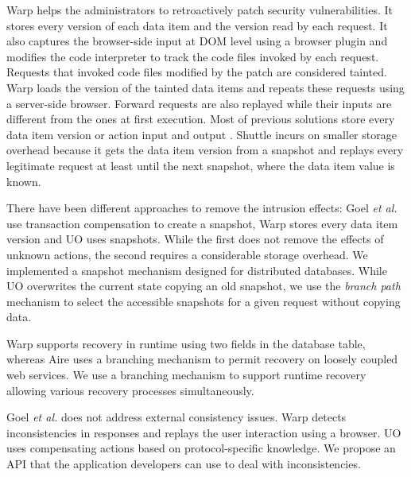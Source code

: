 Warp \cite{warp} helps the administrators to retroactively patch security vulnerabilities. It stores every version of each data item and the version read by each request. It also captures the browser-side input at DOM level using a browser plugin and modifies the code interpreter to track the code files invoked by each request. Requests that invoked code files modified by the patch are considered tainted. Warp loads the version of the tainted data items and repeats these requests using a server-side browser. Forward requests are also replayed while their inputs are different from the ones at first execution. Most of previous solutions store every data item version or action input and output \cite{warp,aire}. Shuttle incurs on smaller storage overhead because it gets the data item version from a snapshot and replays every legitimate request at least until the next snapshot, where the data item value is known.

There have been different approaches to remove the intrusion effects: Goel \emph{et al.} use transaction compensation to create a snapshot, Warp stores every data item version and UO uses snapshots. While the first does not remove the effects of unknown actions, the second requires a considerable storage overhead. We implemented a snapshot mechanism designed for distributed databases. While UO overwrites the current state copying an old snapshot, we use the \textit{branch path} mechanism to select the accessible snapshots for a given request without copying data.

Warp supports recovery in runtime using two fields in the database table, whereas Aire uses a branching mechanism to permit recovery on loosely coupled web services. We use a branching mechanism to support runtime recovery allowing various recovery processes simultaneously. 

Goel \emph{et al.} does not address external consistency issues. Warp \cite{warp} detects inconsistencies in responses and replays the user interaction using a browser. UO uses compensating actions based on protocol-specific knowledge. We propose an API that the application developers can use to deal with inconsistencies.

